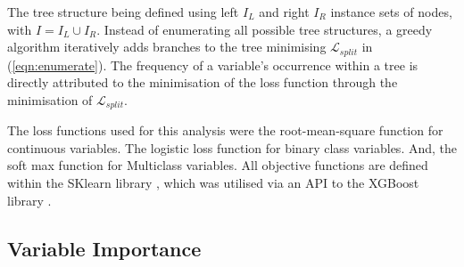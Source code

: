 \documentclass[review,12pt,authoryear]{elsarticle}
\begin{document}
\begin{linenumbers}
The tree structure being defined using left $I_L$ and right $I_R$ instance sets of nodes, with $I = I_L \cup I_R$. Instead of enumerating all possible tree structures, a greedy algorithm iteratively adds branches to the tree minimising $ \mathcal{L}_{split} $ in (\ref{eqn:enumerate}). The frequency of a variable's occurrence within a tree is directly attributed to the minimisation of the loss function through the minimisation of $ \mathcal{L}_{split} $.
\par
The loss functions used for this analysis were the root-mean-square function for continuous variables. The logistic loss function for binary class variables. And, the soft max function for Multiclass variables. All objective functions are defined within the SKlearn library \citep{sklearn_api}, which was utilised via an API to the XGBoost library \citep{chenXGBoostScalableTree2016}.
\par
\subsection{Variable Importance}\label{sec:importance}


\end{linenumbers}
\end{document}
